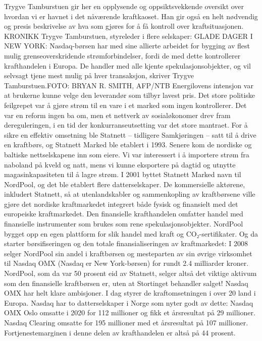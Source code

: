 \documentclass[
]{book}
\begin{document}
Trygve Tamburstuen gir her en opplysende og oppsiktsvekkende oversikt over hvordan vi er havnet i det nåværende kraftkaoset. Han gir også en helt nødvendig og presis beskrivelse av hva som gjøres for å få kontroll over kraftsituasjonen.
KRONIKK Trygve Tamburstuen, styreleder i flere selskaper:
GLADE DAGER I NEW YORK: Nasdaq-børsen har med sine allierte arbeidet for bygging av flest mulig grenseoverskridende strømforbindelser, fordi de med dette kontrollerer krafthandelen i Europa. De handler med alle kjente spekulasjonsobjekter, og vil selvsagt tjene mest mulig på hver transaksjon, skriver Trygve Tamburstuen.FOTO: BRYAN R. SMITH, AFP/NTB
Energilovens intensjon var at brukerne kunne velge den leverandør som tilbyr lavest pris. Det store politiske feilgrepet var å gjøre strøm til en vare i et marked som ingen kontrollerer. Det var en reform ingen ba om, men et nettverk av sosialøkonomer drev fram dereguleringen, i en tid der konkurranseutsetting var det store mantraet.
For å sikre en effektiv omsetning ble Statnett -- tidligere Samkjøringen -- satt til å drive en kraftbørs, og Statnett Marked ble etablert i 1993. Senere kom de nordiske og baltiske nettselskapene inn som eiere. Vi var interessert i å importere strøm fra naboland på kveld og natt, mens vi kunne eksportere på dagtid og utnytte magasinkapasiteten til å lagre strøm.
I 2001 byttet Statnett Marked navn til NordPool, og det ble etablert flere datterselskaper. De kommersielle aktørene, inkludert Statnett, så at utenlandskabler og sammenkopling av kraftbørsene ville gjøre det nordiske kraftmarkedet integrert både fysisk og finansielt med det europeiske kraftmarkedet.
Den finansielle krafthandelen omfatter handel med finansielle instrumenter som brukes som rene spekulasjonsobjekter. NordPool bygget opp en egen plattform for slik handel med kraft og CO₂-sertifikater. Og da starter børsifiseringen og den totale finansialiseringen av kraftmarkedet: I 2008 selger NordPool sin andel i kraftbørsen og mesteparten av sin øvrige virksomhet til Nasdaq OMX (Nasdaq er New York-børsen) for rundt 2.4 milliarder kroner.
NordPool, som da var 50 prosent eid av Statnett, selger altså det viktige aktivum som den finansielle kraftbørsen er, uten at Stortinget behandler salget!
Nasdaq OMX har helt klare ambisjoner. I dag styrer de kraftomsetningen i over 20 land i Europa. Nasdaq har to datterselskaper i Norge som nyter godt av dette: Nasdaq OMX Oslo omsatte i 2020 for 112 millioner og fikk et årsresultat på 29 millioner. Nasdaq Clearing omsatte for 195 millioner med et årsresultat på 107 millioner. Fortjenestemarginen i denne delen av krafthandelen er altså på 44 prosent.
\end{document}
